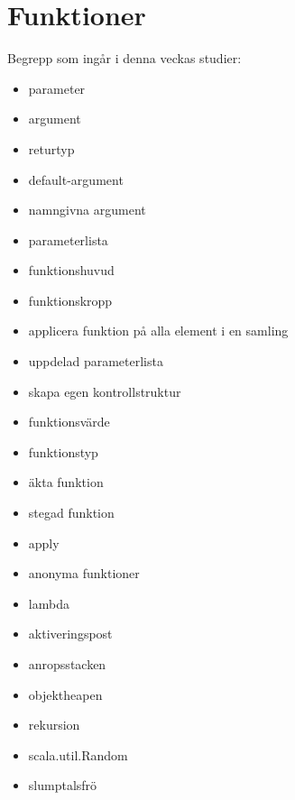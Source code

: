 \chapter{Funktioner}\label{chapter:W03}
Begrepp som ingår i denna veckas studier:
\begin{itemize}[noitemsep,label={$\square$},leftmargin=*]
\item parameter
\item argument
\item returtyp
\item default-argument
\item namngivna argument
\item parameterlista
\item funktionshuvud
\item funktionskropp
\item applicera funktion på alla element i en samling
\item uppdelad parameterlista
\item skapa egen kontrollstruktur
\item funktionsvärde
\item funktionstyp
\item äkta funktion
\item stegad funktion
\item apply
\item anonyma funktioner
\item lambda
\item aktiveringspost
\item anropsstacken
\item objektheapen
\item rekursion
\item scala.util.Random
\item slumptalsfrö\end{itemize}
